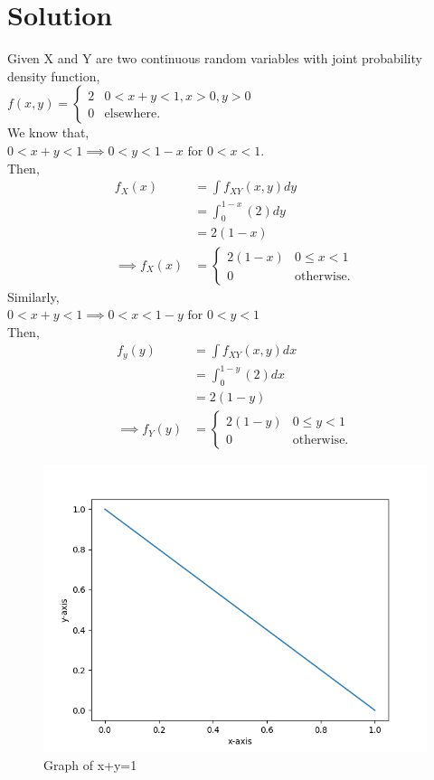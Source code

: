 \documentclass[journal,12pt,twocolumn]{IEEEtran}
\begin{document}
\section{\textbf{Solution}}
Given X and Y are two continuous random variables with joint probability density function,\\
$
f(x,y)= 
\begin{cases}
2 & 0<x+y<1, x>0, y>0 \\
0 & \text{elsewhere}.
\end{cases}
$
\\We know that,\\
$0<x+y<1  \implies 0<y<1-x \text{ for } 0<x<1.$\\ 
Then,
\begin{align}
    f_X(x) &= \int f_{XY}(x,y)dy\\
    &= \int_{0}^{1-x} (2)dy\\
    &= 2(1-x)\\
\implies f_X(x) &=
    \begin{cases}
    2(1-x) & 0 \leq x <1\\
    0 & \text{otherwise}.
    \end{cases}
\end{align}
Similarly,\\
$ 0<x+y<1 \implies 0<x<1-y \text{ for } 0<y<1$ \\
Then,
\begin{align}
    f_y(y) &= \int f_{XY}(x,y)dx\\
    &= \int_{0}^{1-y} (2)dx\\
    &= 2(1-y)\\
\implies f_Y(y ) &=
    \begin{cases}
    2(1-y) & 0 \leq y <1\\
    0 & \text{otherwise}.
    \end{cases}
\end{align}
\begin{figure}[ht]
    \centering
    \includegraphics[width=\columnwidth]{Figure_1.png}
    \caption{Graph of x+y=1}
    \label{Figure_1}
\end{figure}
\end{document}
